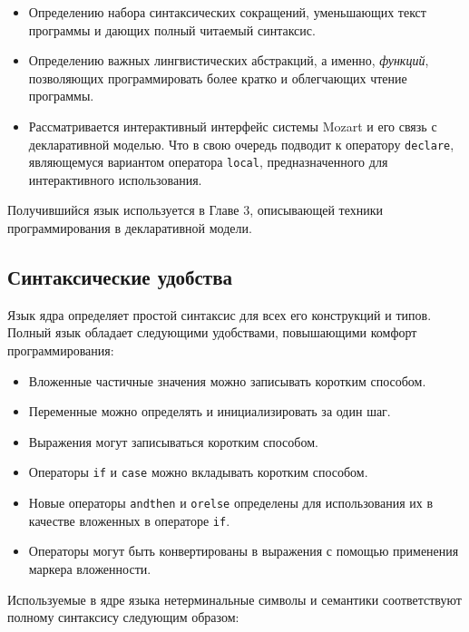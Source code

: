 \begin{itemize}
\item{Определению набора синтаксических сокращений, уменьшающих текст программы и дающих полный читаемый синтаксис.}

\item{Определению важных лингвистических абстракций, а именно, \emph{функций}, позволяющих программировать более кратко и облегчающих чтение программы.}

\item{Рассматривается интерактивный интерфейс системы Mozart и его связь с декларативной моделью. Что в свою очередь подводит к оператору \lstinline|declare|, являющемуся вариантом оператора \lstinline|local|, предназначенного для интерактивного использования.}
\end{itemize}

Получившийся язык используется в Главе 3, описывающей техники программирования в декларативной модели.

\subsection{Синтаксические удобства}

Язык ядра определяет простой синтаксис для всех его конструкций и типов. Полный язык обладает следующими удобствами, повышающими комфорт программирования:

\begin{itemize}
\item{Вложенные частичные значения можно записывать коротким способом.}

\item{Переменные можно определять и инициализировать за один шаг.}

\item{Выражения могут записываться коротким способом.}

\item{Операторы \lstinline|if| и \lstinline|case| можно вкладывать коротким способом.}

\item{Новые операторы \lstinline|andthen| и \lstinline|orelse| определены для использования их в качестве вложенных в операторе \lstinline|if|.}

\item{Операторы могут быть конвертированы в выражения с помощью применения маркера вложенности.}
\end{itemize}

Используемые в ядре языка нетерминальные символы и семантики соответствуют полному синтаксису следующим образом:

